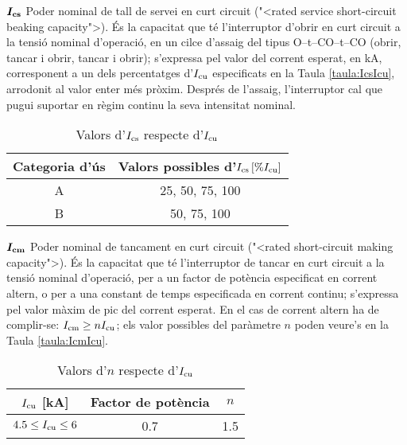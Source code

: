 \begin{list}{}
    \item[$\boldsymbol{I_\mathrm{cs}}$] Poder nominal de tall de servei en curt circuit ({"<}rated service  short-circuit beaking capacity{">}). \'{E}s la capacitat que t\'{e} l'interruptor d'obrir en curt circuit a la tensi\'{o} nominal d'operaci\'{o}, en un cilce d'assaig del tipus O--t--CO--t--CO (obrir, tancar i obrir, tancar i obrir); s'expressa pel valor  del corrent esperat, en kA, corresponent a un dels percentatges d'$I_\mathrm{cu}$ especificats en la Taula \vref{taula:IcsIcu}, arrodonit al valor enter m\'{e}s pr\`{o}xim. Despr\'{e}s de l'assaig, l'interruptor cal que pugui suportar en r\`{e}gim continu la seva intensitat nominal.
         \begin{table}[h]
           \caption{\label{taula:IcsIcu} Valors d'$I_\mathrm{cs}$ respecte d'$I_\mathrm{cu}$}
           \begin{center}\begin{tabular}{cc}
           \toprule[1pt]
           Categoria d'\'{u}s &  Valors possibles d'$I_\mathrm{cs}\, [\% I_\mathrm{cu}]$ \\
           \midrule
           A &  25, 50, 75, 100   \\
           B & 50, 75, 100   \\
           \bottomrule[1pt]
           \end{tabular} \end{center}
         \end{table}
    \item[$\boldsymbol{I_\mathrm{cm}}$] Poder nominal de tancament en curt circuit ({"<}rated short-circuit making capacity{">}). \'{E}s la capacitat que t\'{e} l'interruptor de tancar en curt circuit a la tensi\'{o} nominal d'operaci\'{o}, per a un factor de pot\`{e}ncia especificat en corrent altern, o per a una constant de temps especificada en corrent continu; s'expressa pel valor m\`{a}xim de pic del corrent esperat. En el cas de corrent altern ha de complir-se: $I_\mathrm{cm} \geq n I_\mathrm{cu}$; els valor possibles del par\`{a}metre $n$ poden veure's en la Taula \vref{taula:IcmIcu}.
        \begin{table}[h]
           \caption{\label{taula:IcmIcu} Valors d'$n$ respecte d'$I_\mathrm{cu}$}
           \begin{center}\begin{tabular}{ccc}
           \toprule[1pt]
           $I_\mathrm{cu}$  [kA] &  Factor de pot\`{e}ncia & $n$ \\
           \midrule
           $\num{4,5} \leq I_\mathrm{cu} \leq 6$\phantom{0} & \num{0,7}\phantom{0}  & \num{1,5}   \\

\end{tabular}
\end{center}
\end{table}
\end{list}
